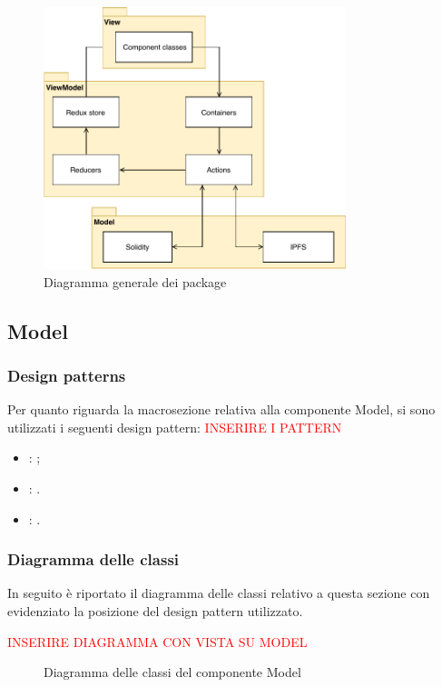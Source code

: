 \begin{figure}[h]
	\centering
	\includegraphics[height=3in]{./Diagrammi/FrameworkPackageGenerale.pdf}
	\caption{Diagramma generale dei package}
	\label{}
\end{figure}

	\subsection{Model}
		\subsubsection{Design patterns}
		Per quanto riguarda la macrosezione relativa alla componente Model, si sono utilizzati i seguenti design pattern: {\textcolor{red}{INSERIRE I PATTERN}}
			\begin{itemize}
				\item \textbf{}: ;
				\item \textbf{}: .
				\item \textbf{}: .
			\end{itemize}
		
		\subsubsection{Diagramma delle classi}
		In seguito è riportato il diagramma delle classi relativo a questa sezione con evidenziato la posizione del design pattern utilizzato.
	
	{\textcolor{red}{INSERIRE DIAGRAMMA CON VISTA SU MODEL}}
	\begin{figure}[h]
		\centering
		\caption{Diagramma delle classi del componente Model}
		\label{}
	\end{figure}
	
